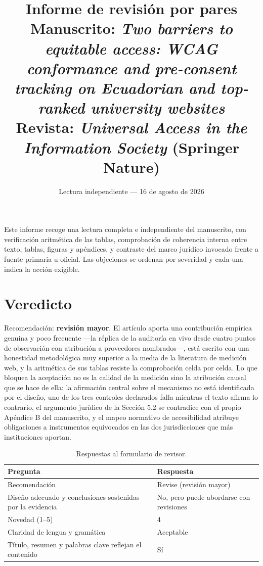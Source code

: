 \documentclass[11pt,a4paper]{article}
\title{\textbf{Informe de revisi\'on por pares}\\[4pt]
	\large Manuscrito: \emph{Two barriers to equitable access: WCAG conformance and pre-consent tracking on Ecuadorian and top-ranked university websites}\\[4pt]
	\normalsize Revista: \emph{Universal Access in the Information Society} (Springer Nature)}
\author{}
\date{Lectura independiente --- 16 de agosto de 2026}
\begin{document}
\maketitle
\thispagestyle{fancy}

\noindent Este informe recoge una lectura completa e independiente del manuscrito, con verificaci\'on aritm\'etica de las tablas, comprobaci\'on de coherencia interna entre texto, tablas, figuras y ap\'endices, y contraste del marco jur\'idico invocado frente a fuente primaria u oficial. Las objeciones se ordenan por severidad y cada una indica la acci\'on exigible.

\section{Veredicto}

Recomendaci\'on: \textbf{revisi\'on mayor}. El art\'iculo aporta una contribuci\'on emp\'irica genuina y poco frecuente ---la r\'eplica de la auditor\'ia en vivo desde cuatro puntos de observaci\'on con atribuci\'on a proveedores nombrados---, est\'a escrito con una honestidad metodol\'ogica muy superior a la media de la literatura de medici\'on web, y la aritm\'etica de sus tablas resiste la comprobaci\'on celda por celda. Lo que bloquea la aceptaci\'on no es la calidad de la medici\'on sino la atribuci\'on causal que se hace de ella: la afirmaci\'on central sobre el mecanismo no est\'a identificada por el dise\~no, uno de los tres controles declarados falla mientras el texto afirma lo contrario, el argumento jur\'idico de la Secci\'on 5.2 se contradice con el propio Ap\'endice B del manuscrito, y el mapeo normativo de accesibilidad atribuye obligaciones a instrumentos equivocados en las dos jurisdicciones que m\'as instituciones aportan.

\begin{table}[htbp]
	\centering
	\small
	\caption{Respuestas al formulario de revisor.}
	\begin{tabular}{@{}L{9.4cm}L{4.6cm}@{}}
		\toprule
		\textbf{Pregunta} & \textbf{Respuesta} \\
		\midrule
		Recomendaci\'on & Revise (revisi\'on mayor) \\
		\addlinespace
		Dise\~no adecuado y conclusiones sostenidas por la evidencia & No, pero puede abordarse con revisiones \\
		\addlinespace
		Novedad (1--5) & 4 \\
		\addlinespace
		Claridad de lengua y gram\'atica & Aceptable \\
		\addlinespace
		T\'itulo, resumen y palabras clave reflejan el contenido & S\'i \\
		\bottomrule
	\end{tabular}
\end{table}
\end{document}

